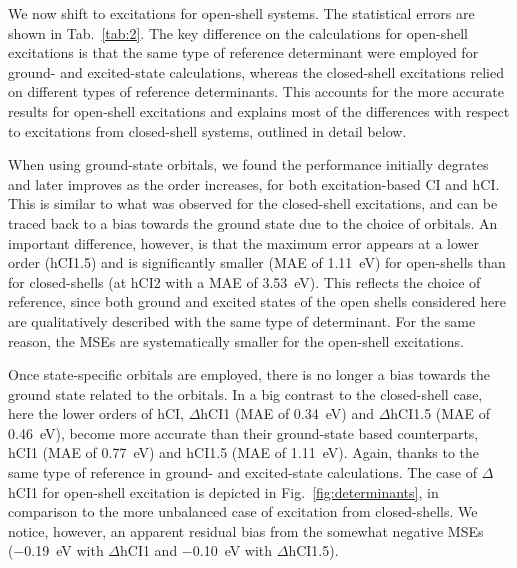 \documentclass[aip,jcp,reprint,noshowkeys,superscriptaddress]{revtex4-1}
\begin{document}
We now shift to excitations for open-shell systems.
The statistical errors are shown in Tab.~\ref{tab:2}.
The key difference on the calculations for open-shell excitations is that the same type of reference determinant were employed for ground- and excited-state calculations,
whereas the closed-shell excitations relied on different types of reference determinants.
This accounts for the more accurate results for open-shell excitations and explains most of the differences with respect to excitations from closed-shell systems, outlined in detail below.


When using ground-state orbitals, we found the performance initially degrates and later improves as the order increases, for both excitation-based CI and hCI.
This is similar to what was observed for the closed-shell excitations, 
and can be traced back to a bias towards the ground state due to the choice of orbitals.
An important difference, however, is that the maximum error appears at a lower order (hCI1.5) and is significantly smaller (MAE of \SI{1.11}{\eV}) for open-shells
than for closed-shells (at hCI2 with a MAE of \SI{3.53}{\eV}).
This reflects the choice of reference, since both ground and excited states of the open shells considered here are qualitatively described with the same type of determinant.
For the same reason, the MSEs are systematically smaller for the open-shell excitations.

Once state-specific orbitals are employed, there is no longer a bias towards the ground state related to the orbitals.
In a big contrast to the closed-shell case, here the lower orders of hCI, $\Delta$hCI1 (MAE of \SI{0.34}{\eV}) and $\Delta$hCI1.5 (MAE of \SI{0.46}{\eV}), 
become more accurate than their ground-state based counterparts, hCI1 (MAE of \SI{0.77}{\eV}) and hCI1.5 (MAE of \SI{1.11}{\eV}).
Again, thanks to the same type of reference in ground- and excited-state calculations.
The case of $\Delta$hCI1 for open-shell excitation is depicted in Fig.~\ref{fig:determinants}, in comparison to the more unbalanced case of excitation from closed-shells.
We notice, however, an apparent residual bias from the somewhat negative MSEs (\SI{-0.19}{\eV} with $\Delta$hCI1 and \SI{-0.10}{\eV} with $\Delta$hCI1.5).
\end{document}

